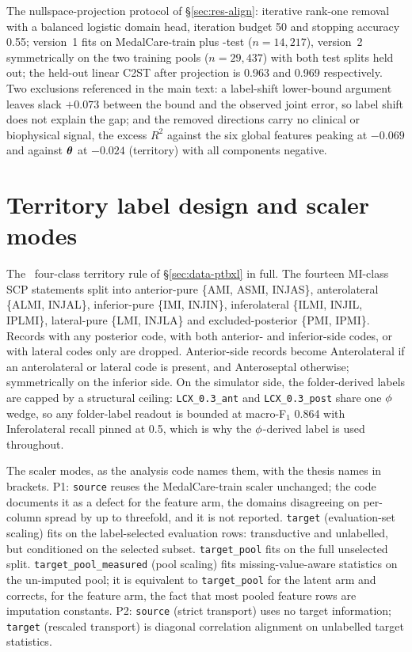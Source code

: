 The nullspace-projection protocol of \S\ref{sec:res-align}: iterative rank-one removal with a balanced logistic domain head, iteration budget 50 and stopping accuracy 0.55; version~1 fits on MedalCare-train plus \ptbxl-test ($n=14{,}217$), version~2 symmetrically on the two training pools ($n=29{,}437$) with both test splits held out; the held-out linear C2ST after projection is 0.963 and 0.969 respectively. Two exclusions referenced in the main text: a label-shift lower-bound argument leaves slack $+0.073$ between the bound and the observed joint error, so label shift does not explain the gap; and the removed directions carry no clinical or biophysical signal, the excess $R^2$ against the six global features peaking at $-0.069$ and against $\boldsymbol{\theta}$ at $-0.024$ (territory) with all components negative. 

\section[Labels and scaler modes]{Territory label design and scaler modes}
\label{app:labels}

The \ptbxl\ four-class territory rule of \S\ref{sec:data-ptbxl} in full. The fourteen MI-class SCP statements split into anterior-pure \{AMI, ASMI, INJAS\}, anterolateral \{ALMI, INJAL\}, inferior-pure \{IMI, INJIN\}, inferolateral \{ILMI, INJIL, IPLMI\}, lateral-pure \{LMI, INJLA\} and excluded-posterior \{PMI, IPMI\}. Records with any posterior code, with both anterior- and inferior-side codes, or with lateral codes only are dropped. Anterior-side records become Anterolateral if an anterolateral or lateral code is present, and Anteroseptal otherwise; symmetrically on the inferior side. On the simulator side, the folder-derived labels are capped by a structural ceiling: \texttt{LCX\_0.3\_ant} and \texttt{LCX\_0.3\_post} share one $\phi$ wedge, so any folder-label readout is bounded at macro-F$_1$ 0.864 with Inferolateral recall pinned at 0.5, which is why the $\phi$-derived label is used throughout. 

The scaler modes, as the analysis code names them, with the thesis names in brackets. P1: \texttt{source} reuses the MedalCare-train scaler unchanged; the code documents it as a defect for the feature arm, the domains disagreeing on per-column spread by up to threefold, and it is not reported. \texttt{target} (evaluation-set scaling) fits on the label-selected evaluation rows: transductive and unlabelled, but conditioned on the selected subset. \texttt{target\_pool} fits on the full unselected split. \texttt{target\_pool\_measured} (pool scaling) fits missing-value-aware statistics on the un-imputed pool; it is equivalent to \texttt{target\_pool} for the latent arm and corrects, for the feature arm, the fact that most pooled feature rows are imputation constants. P2: \texttt{source} (strict transport) uses no target information; \texttt{target} (rescaled transport) is diagonal correlation alignment on unlabelled target statistics. 

